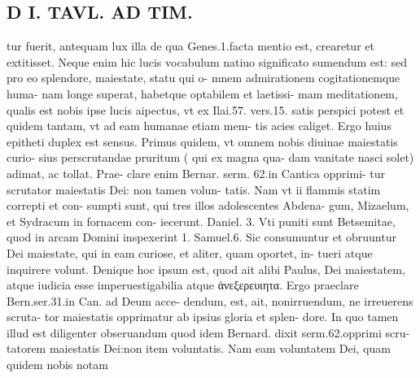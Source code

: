 \documentclass{article}
\begin{document}
\begin{pages}
\section*{D I. TAVL. AD TIM. }
\marginpar{[ p.400 ]}\pstart tur fuerit, antequam lux illa de qua Genes.1.facta mentio est, crearetur et extitisset. Neque enim hic lucis vocabulum natiuo significato sumendum est: sed pro eo splendore, maiestate, statu qui o- mnem admirationem cogitationemque huma- nam longe superat, habetque optabilem et laetissi- mam meditationem, qualis est nobis ipse lucis aipectus, vt ex Ilai.57. vers.15. satis perspici potest et quidem tantam, vt ad eam humanae etiam mem- tis acies caliget.  \pend\pstart Ergo huius epitheti duplex est sensus. Primus quidem, vt omnem nobis diuinae maiestatis curio- sius perscrutandae pruritum ( qui ex magna qua- dam vanitate nasci solet) adimat, ac tollat. Prae- clare enim Bernar. serm. 62.in Cantica opprimi- tur scrutator maiestatis Dei: non tamen volun- tatis. Nam vt ii flammis statim correpti et con- sumpti sunt, qui tres illos adolescentes Abdena- gum, Mizaelum, et Sydracum in fornacem con- iecerunt. Daniel. 3. Vti puniti sunt Betsemitae, quod in arcam Domini inspexerint 1. Samuel.6. Sic consumuntur et obruuntur Dei maiestate, qui in eam curiose, et aliter, quam oportet, in- tueri atque inquirere volunt. Denique  hoc ipsum est, quod ait alibi Paulus, Dei maiestatem, atque iudicia esse imperuestigabilia atque ἀνεξερευιητα. Ergo praeclare Bern.ser.31.in Can. ad Deum acce- dendum, est, ait, nonirruendum, ne irreuerens scruta- tor maiestatis opprimatur ab ipsius gloria et splen- dore. In quo tamen illud est diligenter obseruandum quod idem Bernard. dixit serm.62.opprimi scru- tatorem maiestatis Dei:non item voluntatis. Nam eam voluntatem Dei, quam quidem nobis notam  \pend

\end{pages}
\end{document}
